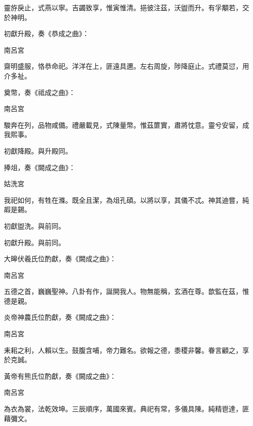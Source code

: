 \begin{pinyinscope}
 靈斿戾止，式燕以寧。吉蠲致享，惟寅惟清。挹彼注茲，沃盥而升。有孚顒若，交於神明。



 初獻升殿，奏《恭成之曲》：



 南呂宮



 齋明盛服，恪恭命祀。洋洋在上，匪遠具邇。左右周旋，陟降庭止。式禮莫愆，用介多祉。



 奠幣，奏《祗成之曲》：



 南呂宮



 駿奔在列，品物咸備。禮嚴載見，式陳量幣。惟茲篚實，肅將忱意。靈兮安留，成我熙事。



 初獻降殿。與升殿同。



 捧俎，奏《闕成之曲》：



 姑洗宮



 我祀如何，有牲在滌。既全且潔，為俎孔碩。以將以享，其儀不忒。神其迪嘗，純嘏是錫。



 初獻盥洗。與前同。



 初獻升殿。與前同。



 大皞伏羲氏位酌獻，奏《闕成之曲》：



 南呂宮



 五德之首，巍巍聖神。八卦有作，誕開我人。物無能稱，玄酒在尊。歆監在茲，惟德是親。



 炎帝神農氏位酌獻，奏《闕成之曲》：



 南呂宮



 耒耜之利，人賴以生。鼓腹含哺，帝力難名。欲報之德，黍稷非馨。眷言顧之，享於克誠。



 黃帝有熊氏位酌獻，奏《闕成之曲》：



 南呂宮



 為衣為裳，法乾效坤。三辰順序，萬國來賓。典祀有常，多儀具陳。純精鬯達，匪藉彌文。




\end{pinyinscope}

